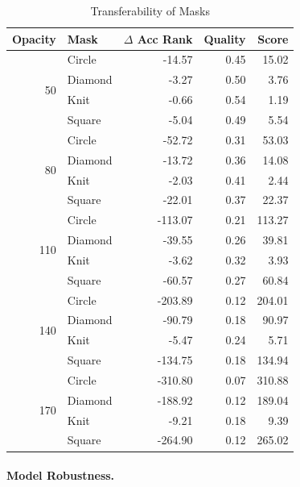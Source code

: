 \documentclass[a4paper, oneside]{discothesis}
\begin{document}
\begin{table}[h]
    \centering
    \begin{tabular}{rlrrr}
        \toprule
        Opacity & Mask & $\Delta$ Acc Rank & Quality & Score \\
        \midrule
        \multirow{4}{*}{50}
            & Circle & -14.57 & 0.45 & 15.02 \\
            & Diamond & -3.27 & 0.50 & 3.76 \\
            & Knit & -0.66 & 0.54 & 1.19 \\
            & Square & -5.04 & 0.49 & 5.54 \\
        \midrule
        \multirow{4}{*}{80}
            & Circle & -52.72 & 0.31 & 53.03 \\
            & Diamond & -13.72 & 0.36 & 14.08 \\
            & Knit & -2.03 & 0.41 & 2.44 \\
            & Square & -22.01 & 0.37 & 22.37 \\
        \midrule
        \multirow{4}{*}{110}
            & Circle & -113.07 & 0.21 & 113.27 \\
            & Diamond & -39.55 & 0.26 & 39.81 \\
            & Knit & -3.62 & 0.32 & 3.93 \\
            & Square & -60.57 & 0.27 & 60.84 \\
        \midrule
        \multirow{4}{*}{140}
            & Circle & -203.89 & 0.12 & 204.01 \\
            & Diamond & -90.79 & 0.18 & 90.97 \\
            & Knit & -5.47 & 0.24 & 5.71 \\
            & Square & -134.75 & 0.18 & 134.94 \\
        \midrule
        \multirow{4}{*}{170}
            & Circle & -310.80 & 0.07 & 310.88 \\
            & Diamond & -188.92 & 0.12 & 189.04 \\
            & Knit & -9.21 & 0.18 & 9.39 \\
            & Square & -264.90 & 0.12 & 265.02 \\
        \bottomrule
    \end{tabular}
    \vspace*{0.1cm}
    \caption{Transferability of Masks}
    \label{tab:transferability}
\end{table}
	
\paragraph{Model Robustness.}
\end{document}
